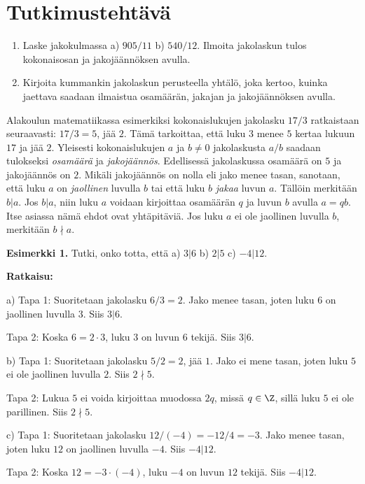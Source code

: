 \section*{Tutkimustehtävä} %
\begin{enumerate}
\item
Laske jakokulmassa a) $905 / 11$ b) $540 / 12$. Ilmoita jakolaskun tulos kokonaisosan ja jakojäännöksen avulla.
\item
Kirjoita kummankin jakolaskun perusteella yhtälö, joka kertoo, kuinka jaettava saadaan
ilmaistua osamäärän, jakajan ja jakojäännöksen avulla.
\end{enumerate}


Alakoulun matematiikassa esimerkiksi kokonaislukujen jakolasku $17/3$ ratkaistaan seuraavasti: $17/3 = 5$, jää $2$. Tämä tarkoittaa, että luku $3$ menee $5$ kertaa lukuun $17$ ja jää $2$. Yleisesti kokonaislukujen $a$ ja $b \neq 0$ jakolaskusta $a/b$ saadaan tulokseksi {\em osamäärä} ja {\em jakojäännös}. Edellisessä jakolaskussa osamäärä on $5$ ja jakojäännös on $2$. Mikäli jakojäännös on nolla eli jako menee tasan, sanotaan, että luku $a$ on {\em jaollinen} luvulla $b$ tai että luku $b$ {\em jakaa} luvun $a$. Tällöin merkitään $b|a$. Jos $b|a$, niin luku $a$ voidaan kirjoittaa osamäärän $q$ ja luvun $b$ avulla $a = qb$. Itse asiassa nämä ehdot ovat yhtäpitäviä. Jos luku $a$ ei ole jaollinen luvulla $b$, merkitään $b \nmid a$.

{\bf Esimerkki 1.} Tutki, onko totta, että a)  $3 | 6$  b)  $2 | 5$ c) $-4|12$.

{\bf Ratkaisu:}

a) Tapa 1: Suoritetaan jakolasku $6/3= 2$. Jako menee tasan, joten luku $6$ on jaollinen luvulla $3$. Siis $3 | 6$.

Tapa 2: Koska $6 = 2 \cdot 3$, luku $3$ on luvun $6$ tekijä. Siis $3 | 6$.

b) Tapa 1: Suoritetaan jakolasku $5/2 = 2$, jää $1$. Jako ei mene tasan, joten luku $5$ ei ole jaollinen luvulla $2$. Siis $2 \nmid 5$.

Tapa 2: Lukua $5$ ei voida kirjoittaa muodossa $2q$, missä $q\in\Z$, sillä luku $5$ ei ole parillinen. Siis $2 \nmid 5$.

c) 
Tapa 1: Suoritetaan jakolasku $12/(-4)=-12/4= -3$. Jako menee tasan, joten luku $12$ on jaollinen luvulla $-4$. Siis $-4 | 12$.

Tapa 2: Koska $12 = -3 \cdot (-4)$, luku $-4$ on luvun $12$ tekijä. Siis $-4 | 12$.

